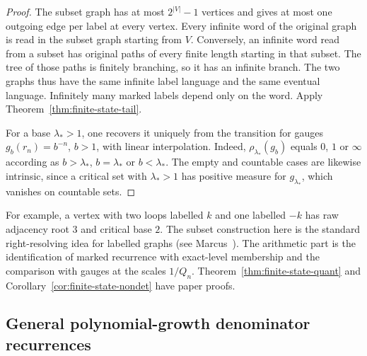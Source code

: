 \documentclass[11pt]{article}
\theoremstyle{definition}
\theoremstyle{remark}
\begin{document}
\begin{proof}
The subset graph has at most $2^{|V|}-1$ vertices and gives at most
one outgoing edge per label at every vertex. Every infinite word
of the original graph is read in the subset graph starting from
$V$. Conversely, an infinite word read from a subset has original
paths of every finite length starting in that subset. The tree of
those paths is finitely branching, so it has an infinite branch.
The two graphs thus have the same infinite label language and
the same eventual language. Infinitely many marked labels depend
only on the word. Apply Theorem~\ref{thm:finite-state-tail}.

For a base $\lambda_*>1$, one recovers it uniquely from the
transition for gauges $g_b(r_n)=b^{-n}$, $b>1$, with linear
interpolation. Indeed, $\rho_{\lambda_*}(g_b)$ equals $0$, $1$
or $\infty$ according as $b>\lambda_*$, $b=\lambda_*$ or
$b<\lambda_*$. The empty and countable cases are likewise
intrinsic, since a critical set with $\lambda_*>1$ has positive
measure for $g_{\lambda_*}$, which vanishes on countable sets.
\end{proof}

For example, a vertex with two loops labelled $k$ and one labelled
$-k$ has raw adjacency root $3$ and critical base $2$. The subset
construction here is the standard right-resolving idea for labelled
graphs (see Marcus~\cite[\S II-F]{MarcusSofic}). The arithmetic
part is the identification of marked recurrence with exact-level
membership and the comparison with gauges at the scales $1/Q_n$.
Theorem~\ref{thm:finite-state-quant} and
Corollary~\ref{cor:finite-state-nondet} have paper proofs.

\subsection{General polynomial-growth denominator recurrences}\label{sec:poly-rec}
\end{document}
